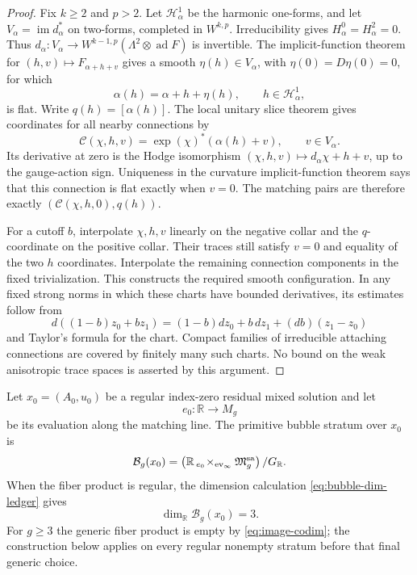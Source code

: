 \documentclass[11pt]{amsart}
\theoremstyle{definition}
\theoremstyle{remark}
\theoremstyle{plain}
\newcommand{\RR}{\mathbb{R}}
\newcommand{\cB}{\mathcal{B}}
\newcommand{\frakM}{\mathfrak{M}}
\newcommand{\ad}{\operatorname{ad}}
\newcommand{\ev}{\operatorname{ev}}
\begin{document}
\begin{proof}
Fix $k\geq2$ and $p>2$. Let $\mathcal H^1_\alpha$ be the harmonic
one-forms, and let $V_\alpha=\operatorname{im}d_\alpha^*$ on two-forms,
completed in $W^{k,p}$. Irreducibility gives $H^0_\alpha=H^2_\alpha=0$.
Thus $d_\alpha:V_\alpha\to W^{k-1,p}(\Lambda^2\otimes\ad F)$ is
invertible. The implicit-function theorem for
$(h,v)\mapsto F_{\alpha+h+v}$ gives a smooth $\eta(h)\in V_\alpha$,
with $\eta(0)=D\eta(0)=0$, for which
\[
 \alpha(h)=\alpha+h+\eta(h),\qquad h\in\mathcal H^1_\alpha,
\]
is flat. Write $q(h)=[\alpha(h)]$. The local unitary slice theorem gives
coordinates for all nearby connections by
\[
 \mathcal C(\chi,h,v)=\exp(\chi)^*(\alpha(h)+v),
 \qquad v\in V_\alpha.
\]
Its derivative at zero is the Hodge isomorphism
$(\chi,h,v)\mapsto d_\alpha\chi+h+v$, up to the gauge-action sign.
Uniqueness in the curvature implicit-function theorem says that this
connection is flat exactly when $v=0$. The matching pairs are therefore
exactly $(\mathcal C(\chi,h,0),q(h))$.

For a cutoff $b$, interpolate $\chi,h,v$ linearly on the negative collar
and the $q$-coordinate on the positive collar. Their traces still satisfy
$v=0$ and equality of the two $h$ coordinates. Interpolate the remaining
connection components in the fixed trivialization. This constructs the
required smooth configuration. In any fixed strong norms in which these
charts have bounded derivatives, its estimates follow from
\[
 d((1-b)z_0+bz_1)
 =(1-b)dz_0+b\,dz_1+(db)(z_1-z_0)
\]
and Taylor's formula for the chart. Compact families of irreducible
attaching connections are covered by finitely many such charts. No bound
on the weak anisotropic trace spaces is asserted by this argument.
\end{proof}

Let $x_0=(A_0,u_0)$ be a regular index-zero residual mixed solution and
let
\[
                         e_0:\RR\longrightarrow M_g
\]
be its evaluation along the matching line.  The primitive bubble stratum
over $x_0$ is
\begin{equation}\label{eq:bubble-stratum}
 \cB_g(x_0)=
 \left(
 \RR\,{}_{e_0}\!\times_{\ev_\infty}\frakM_g^{\rm sa}
 \right)/G_\RR.
\end{equation}
When the fiber product is regular, the dimension calculation
\eqref{eq:bubble-dim-ledger} gives
\begin{equation}\label{eq:bubble-stratum-dim}
                           \dim_\RR\cB_g(x_0)=3.
\end{equation}
For $g\geq3$ the generic fiber product is empty by
\eqref{eq:image-codim}; the construction below applies on every regular
nonempty stratum before that final generic choice.
\end{document}

